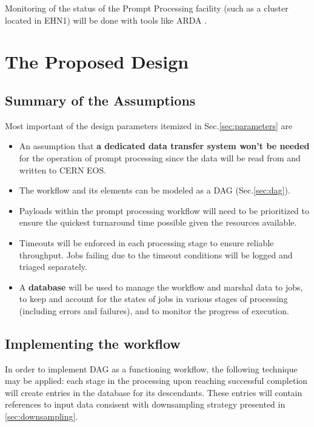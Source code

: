 \documentclass[pdftex,12pt,letter]{article}
\newcommand{\PP}{Prompt Processing\xspace}
\begin{document}
Monitoring of the status of the \PP facility (such as a cluster located in EHN1) will  be done
with tools like ARDA \cite{arda}.


\section{The Proposed Design}
\label{sec:design}
\subsection{Summary of the Assumptions}
Most important of the design parameters itemized in Sec.\ref{sec:parameters} are

\begin{itemize}

\item An assumption that \textbf{a dedicated data transfer system won't be needed} for the
operation of prompt processing since the data will be read from and written to CERN EOS.

\item The workflow and its elements can be modeled as a DAG (Sec.\ref{sec:dag}).

\item Payloads within the prompt processing workflow will need to be prioritized to ensure
the quickest turnaround time possible given the resources available.

\item Timeouts will be enforced in each processing stage to ensure reliable throughput. Jobs
failing due to the timeout conditions will be logged and triaged separately.

\item A \textbf{database} will be used to manage the workflow and marshal data to jobs, to keep and
account for the states of jobs in various stages of processing (including errors and failures),
and to monitor the progress of execution.

\end{itemize}

\subsection{Implementing the workflow}
In order to implement DAG as a functioning workflow, the following technique may be applied:
each stage in the processing upon reaching successful completion will create entries in the database for its
descendants. These entries will contain references to input data consisent with downsampling
strategy presented in \ref{sec:downsampling}.
\end{document}
